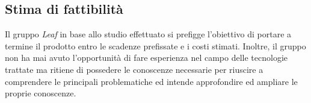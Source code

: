 \documentclass[../nStudioDiFattibilita.tex]{subfiles}
\begin{document}
	\subsection{Stima di fattibilità}
	Il gruppo \textit{Leaf} in base allo studio effettuato si prefigge l'obiettivo di portare a termine il prodotto entro le scadenze prefissate e i costi stimati.
	Inoltre, il gruppo non ha mai avuto l'opportunità di fare esperienza nel campo delle tecnologie trattate ma ritiene di possedere le conoscenze necessarie per riuscire a comprendere le principali problematiche ed intende approfondire ed ampliare le proprie conoscenze.
\end{document}
